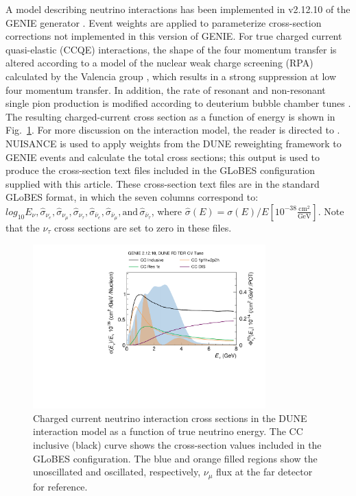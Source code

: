 \documentclass[aps,prd,superscriptaddress]{revtex4-1}
\newcommand{\nue}{\mbox{$\nu_e$}}
\newcommand{\nuebar}{\mbox{$\overline\nu_e$}}
\newcommand{\numu}{\mbox{$\nu_{\mu}$}}
\newcommand{\numubar}{\mbox{$\overline\nu_{\mu}$}}
\newcommand{\nutau}{\mbox{$\nu_{\tau}$}}
\newcommand{\nutaubar}{\mbox{$\overline\nu_{\tau}$}}
\newcommand{\sigmahat}{\mbox{$\hat{\sigma}$}}
\begin{document}
A model describing neutrino interactions has been implemented in v2.12.10 of the GENIE
generator \cite{Andreopoulos:2009rq,Andreopoulos:2015wxa}.
Event weights are applied to parameterize cross-section corrections not implemented in this
version of GENIE.
For true charged current quasi-elastic (CCQE) interactions, the shape of the four momentum
transfer is altered according to a
model of the nuclear weak charge screening (RPA) calculated by the Valencia
group \cite{PhysRevC.72.019902}, which results in a strong suppression at low four momentum transfer.
In addition, the rate of resonant and non-resonant single pion production is modified according
to deuterium bubble chamber tunes \cite{Rodrigues:2016xjj}.
The resulting charged-current cross section as a function of energy is shown in Fig.~\ref{fig:xsec}.
For more discussion on the interaction model, the reader is directed to \cite{Abi:2020qib}.
NUISANCE \cite{Stowell:2016jfr} is used to apply weights from the DUNE reweighting framework
to GENIE events and
calculate the total cross sections; this output is used to produce the cross-section text files
included in the GLoBES configuration supplied with this article.
These cross-section text files are in the standard GLoBES format, in which the seven columns correspond to:
$log_{10}E_{\nu}, \sigmahat_{\nue}, \sigmahat_{\numu}, \sigmahat_{\nutau}, \sigmahat_{\nuebar}, \sigmahat_{\numubar}, \mathrm{and} \,
\sigmahat_{\nutaubar}$,
where $\sigmahat(E) = \sigma(E)/E[10^{-38}\frac{\mathrm{cm}^2}{\mathrm{GeV}}]$.
Note that the $\nu_{\tau}$ cross sections are set to zero in these files.

\begin{figure}[!htpb]
  \centering
  \includegraphics[width=0.8\textwidth]{FDOnAxisPlusXSecNuFit4.pdf}
  \caption{Charged current neutrino interaction cross sections in the DUNE interaction model as
    a function of true neutrino energy. The CC inclusive (black) curve shows the cross-section
    values included in the GLoBES configuration. The blue and orange filled regions show the
    unoscillated and oscillated, respectively, $\numu$ flux at the far detector for reference.}
  \label{fig:xsec}
\end{figure}
\end{document}
